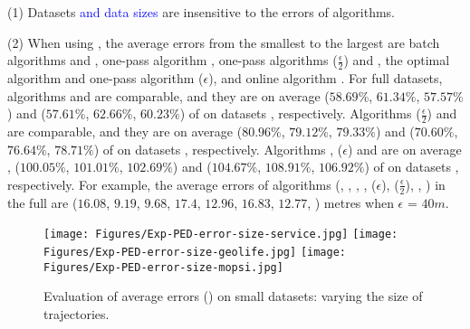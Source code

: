 \sstab (1) {Datasets \textcolor{blue}{and data sizes} are insensitive to the errors of \lsa algorithms.}

\sstab (2) When using \ped, the average errors from the smallest
to the largest are batch algorithms \tpa and \dpa, one-pass
algorithm , one-pass
algorithms \siped($\frac{\epsilon}{2}$) and \operb, the optimal algorithm \opt and one-pass algorithm \siped(${\epsilon}$), and online algorithm \bqsa.
%
For full datasets, algorithms \tpa and \dpa are comparable, and they are on average ($58.69\%$, $61.34\%$,
$57.57\%$) and ($57.61\%$, $62.66\%$, $60.23\%$) of \opt on datasets \dSets, respectively.
Algorithms \siped($\frac{\epsilon}{2}$) and \operb are comparable, and they are on average
($80.96\%$, $79.12\%$, $79.33\%$) and ($70.60\%$, $76.64\%$, $78.71\%$) of \opt on datasets \dSets, respectively.
%
Algorithms , \siped(${\epsilon}$) and \bqsa are on average , ($100.05\%$, $101.01\%$, $102.69\%$) and ($104.67\%$, $108.91\%$, $106.92\%$) of \opt on datasets \dSets, respectively.
For example, the average errors of algorithms
(\opt, \tpa, \dpa, \bqsa, \siped(${\epsilon}$), \siped($\frac{\epsilon}{2}$), \operb,  ) in the full \mopsi are ($16.08$, $9.19$, $9.68$, $17.4$, $12.96$, $16.83$, $12.77$, ) metres when $\epsilon$ = $40m$.




\begin{figure*}[tb!]
	\centering
	\texttt{[image: Figures/Exp-PED-error-size-service.jpg]} 	\hspace{0.5ex}
	\texttt{[image: Figures/Exp-PED-error-size-geolife.jpg]}	\hspace{0.5ex}
	\texttt{[image: Figures/Exp-PED-error-size-mopsi.jpg]}		
	\vspace{-2ex}
	\caption{\small Evaluation of average errors (\ped) on small datasets: varying the size of
		trajectories.}
	\label{fig:ae-ped-size}
	\vspace{-2ex}
\end{figure*}

